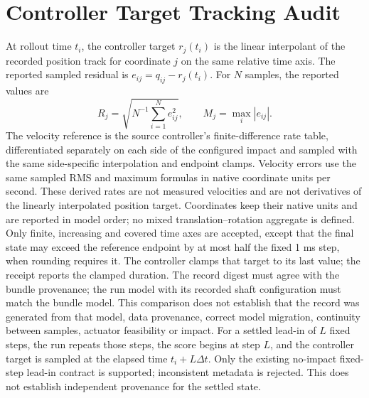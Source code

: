 \documentclass{article}
\begin{document}
\section*{Controller Target Tracking Audit}
At rollout time $t_i$, the controller target $r_j(t_i)$ is the linear
interpolant of the recorded position track for coordinate $j$ on the same
relative time axis. The reported sampled residual is $e_{ij}=q_{ij}-r_j(t_i)$.
For $N$ samples, the reported values are
\[
 R_j=\sqrt{N^{-1}\sum_{i=1}^{N} e_{ij}^2},\qquad
 M_j=\max_i |e_{ij}|.
\]
The velocity reference is the source controller's finite-difference rate
table, differentiated separately on each side of the configured impact and
sampled with the same side-specific interpolation and endpoint clamps.
Velocity errors use the same sampled RMS and maximum formulas in native
coordinate units per second. These derived rates are not measured velocities
and are not derivatives of the linearly interpolated position target.
Coordinates keep their native units and are reported in model order; no mixed
translation--rotation aggregate is defined. Only finite, increasing and
covered time axes are accepted, except that the final state may exceed the
reference endpoint by at most half the fixed 1 ms step, when rounding requires
it. The controller clamps that target to its last value; the receipt reports
the clamped duration. The record digest must agree with the bundle
provenance; the run model with its recorded shaft configuration must match the
bundle model. This comparison does not establish that the record was generated
from that model, data provenance, correct model
migration, continuity between samples, actuator feasibility or impact.
For a settled lead-in of $L$ fixed steps, the run repeats those steps, the
score begins at step $L$, and the controller target is sampled at the elapsed
time $t_i+L\Delta t$. Only the existing no-impact fixed-step lead-in contract
is supported; inconsistent metadata is rejected. This does not establish
independent provenance for the settled state.
\end{document}
